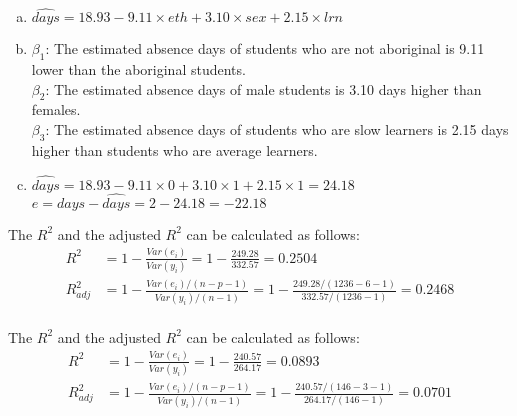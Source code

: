 {
\begin{enumerate}[(a)]
\setlength{\itemsep}{0mm}
\item $\widehat{days} =  18.93 - 9.11 \times eth + 3.10 \times sex + 2.15 \times lrn$
\item $\beta_1$: The estimated absence days of students who are not aboriginal is 9.11 lower than the aboriginal students. \\
$\beta_2$: The estimated absence days of male students is 3.10 days higher than females. \\
$\beta_3$: The estimated absence days of students who are slow learners is 2.15 days higher than students who are average learners.
\item $\widehat{days} =  18.93 -9 .11 \times 0 + 3.10 \times 1 + 2.15 \times 1 = 24.18$ \\
$e = days - \widehat{days} = 2 - 24.18 = -22.18$
\end{enumerate}
}\label{daysAbsent}


{
The $R^2$ and the adjusted $R^2$ can be calculated as follows:
\begin{align*}
R^2 &= 1 - \frac{Var(e_i)}{Var(y_i)} = 1 - \frac{249.28}{332.57} = 0.2504 \\
R_{adj}^2 &= 1 - \frac{Var(e_i) / (n - p - 1)}{Var(y_i) / (n - 1)} = 1 - \frac{249.28 / (1236 - 6 - 1)}{332.57 / (1236 - 1)} = 0.2468 \\
\end{align*}
}


{
The $R^2$ and the adjusted $R^2$ can be calculated as follows:
\begin{align*}
R^2 &= 1 - \frac{Var(e_i)}{Var(y_i)} = 1 - \frac{240.57}{264.17} = 0.0893 \\
R_{adj}^2 &= 1 - \frac{Var(e_i) / (n - p - 1)}{Var(y_i) / (n - 1)} = 1 - \frac{240.57 / (146 - 3 - 1)}{264.17 / ( 146 - 1)} = 0.0701 \\
\end{align*}
}

